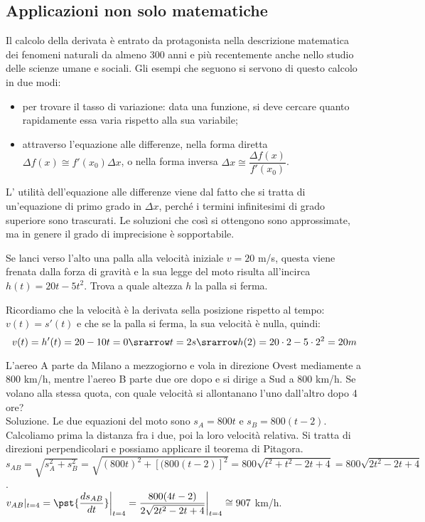 \subsection{Applicazioni non solo matematiche}
Il calcolo della derivata è entrato da protagonista nella descrizione 
matematica dei fenomeni naturali da almeno \(300\) anni e più recentemente
anche nello studio delle scienze umane e sociali. 
Gli esempi che seguono si servono di questo calcolo in due modi:
\begin{itemize}[nosep]
\item per trovare il tasso di variazione:
data una funzione, si deve cercare quanto rapidamente essa varia rispetto
alla sua variabile;
\item attraverso l'equazione alle differenze, 
nella forma diretta \(\Delta f(x)\cong f'(x_0)\Delta x\), o nella forma
inversa \(\Delta x \cong \dfrac{\Delta f(x)}{f'(x_0)}\).
\end{itemize}
L' utilità dell'equazione alle differenze viene dal
fatto che si tratta di un'equazione di primo grado in \(\Delta x\), perché i 
termini infinitesimi di grado superiore sono trascurati. Le soluzioni che 
così si ottengono sono approssimate, ma in genere il grado di imprecisione è 
sopportabile.

\begin{esempio}
Se lanci verso l'alto una palla alla velocità iniziale \(v=20\) m/s, questa 
viene  frenata dalla forza di gravità e la sua legge del moto risulta 
all'incirca  \(h(t)=20t-5t^2\). Trova a quale altezza \(h\) la palla si ferma.

Ricordiamo che la velocità è la derivata sella posizione rispetto al tempo:
\(v(t) = s'(t)\) e che se la palla si ferma, la sua velocità è nulla, quindi:
\[v(t) = h'(t) = 20-10t = 0 \srarrow t = 2s \srarrow 
  h(2) = 20 \cdot 2-5 \cdot 2^2 = 20 m\]
\end{esempio}

\begin{esempio}
L'aereo A parte da Milano a mezzogiorno e vola in direzione Ovest 
mediamente a 
\(800\) km/h, mentre l'aereo B parte due ore dopo e si dirige a Sud a \(800\) 
km/h. Se volano alla stessa quota, con quale velocità si allontanano l'uno 
dall'altro dopo 4 ore?\\
Soluzione. Le due equazioni del moto sono \(s_A=800t\) e \(s_B=800(t-2)\). 
Calcoliamo prima la distanza fra i due, poi la loro velocità relativa.
Si tratta di direzioni perpendicolari e possiamo applicare il teorema di 
Pitagora.\\
\(s_{AB}=\sqrt{s_A^2+s_B^2}=\sqrt{(800t)^2+[(800(t-2)]^2}=
800\sqrt{t^2+t^2-2t+4}=800\sqrt{2t^2-2t+4}\).\\
\(v_{AB}|_{t=4}=\pst{\dfrac{ds_{AB}}{dt}}\bigg|_{t=4}=\dfrac{800(4t-2)}{2\sqrt{
2t
^2-2t+4}}\bigg|_{t=4}\cong 907\) km/h.
\end{esempio}

